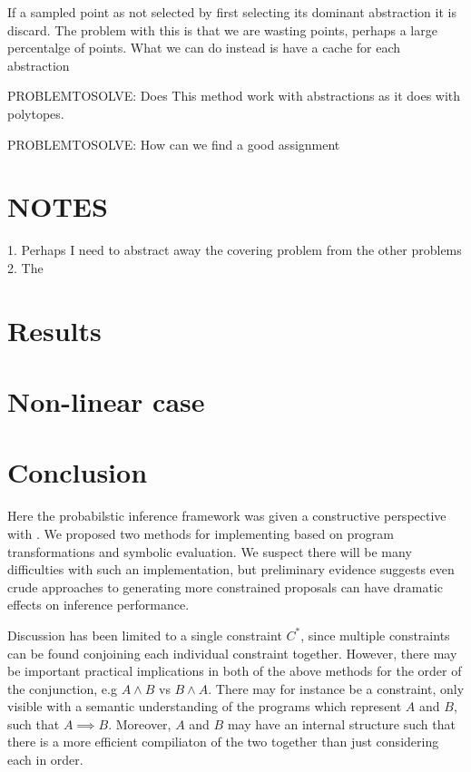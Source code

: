 If a sampled point as not selected by first selecting its dominant abstraction it is discard.
The problem with this is that we are wasting points, perhaps a large percentalge of points.
What we can do instead is have a cache for each abstraction

PROBLEMTOSOLVE: Does This method work with abstractions as it does with polytopes.

PROBLEMTOSOLVE: How can we find a good assignment

\section{NOTES}
1. Perhaps I need to abstract away the covering problem from the other problems
2. The

\section{Results}

\section{Non-linear case}

\section{Conclusion}
Here the probabilstic inference framework  was given a constructive perspective with .
We proposed two methods for implementing  based on program transformations and symbolic evaluation.
We suspect there will be many difficulties with such an implementation, but preliminary evidence suggests even crude approaches to generating more constrained proposals can have dramatic effects on inference performance.

Discussion has been limited to a single constraint $C^*$, since multiple constraints can be found conjoining each individual constraint together.
However, there may be important practical implications in both of the above methods for the order of the conjunction, e.g $A \land B$ vs $B \land A$.
There may for instance be a constraint, only visible with a semantic understanding of the programs which represent $A$ and $B$, such that $A \implies B$.
Moreover, $A$ and $B$ may have an internal structure such that there is a more efficient compiliaton of the two together than just considering each in order.

